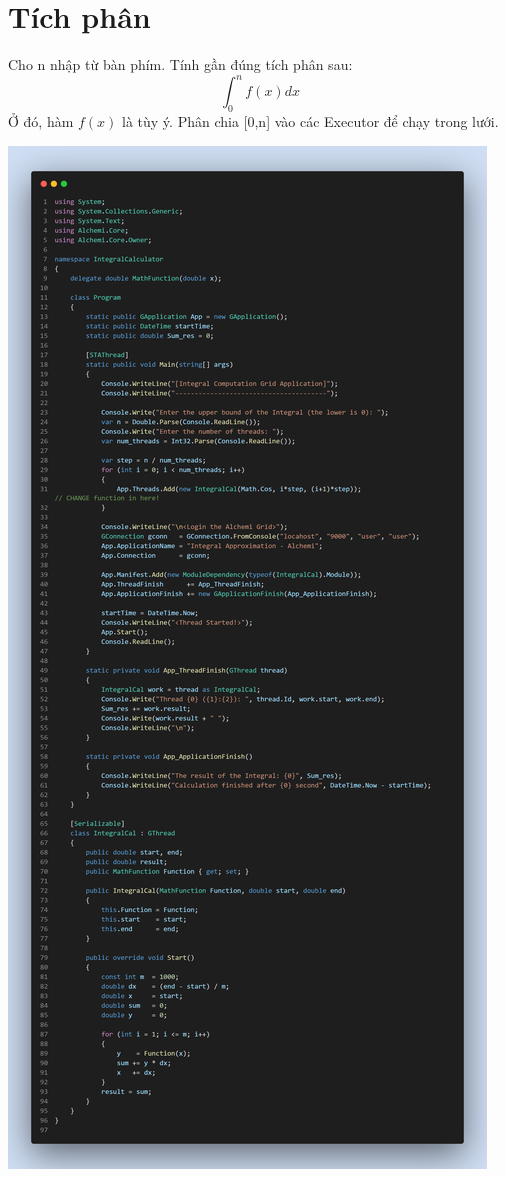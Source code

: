 \documentclass[12pt,a4paper]{report}
\begin{document}
\chapter{Tích phân}

\begin{tcolorbox}[title=Đề bài, colback=red!5!white, colframe=red!70!black]
Cho n nhập từ bàn phím. Tính gần đúng tích phân sau:
$$\int_0^n f(x)dx$$
Ở đó, hàm $f(x)$ là tùy ý. Phân chia [0,n] vào các Executor để chạy trong lưới.
\end{tcolorbox}

\begin{center}
\includegraphics[trim=0in 37.2in 0in 0in, clip, scale=.23]{./Figures/IntegralCalculator/IntegralCalculator}

\end{center}
\end{document}
